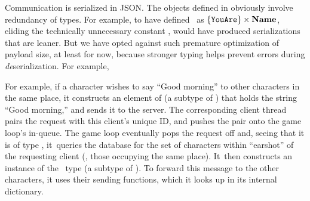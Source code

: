 
Communication is serialized in JSON\@. The objects defined
in  obviously involve redundancy of types. For
example, to have defined \youarevalset\ as
$\{ \texttt{YouAre} \} \times \textbf{Name} $, eliding the technically
unnecessary constant \charnametg, would have produced serializations
that are leaner. But we have opted against such premature optimization
of payload size, at least for now, because stronger typing helps
prevent errors during {\em de}serialization. For example,

For example, if a character wishes to say ``Good morning'' to other
characters in the same place, it constructs an element of
\sayreqset (a subtype of \reqset) that
holds the string ``Good morning,'' and sends it to the server.  The
corresponding client thread pairs the request with this client's
unique ID, and pushes the pair onto the game loop's in-queue.  The
game loop eventually pops the request off and, seeing that it is of
type \sayreqset, it~queries the database for the set of characters
within ``earshot'' of the requesting client (\ie, those occupying the
same place).  It~then constructs an instance of the
\saidevtset\ type (a subtype of \evtset).
To forward this message to the other characters, it uses their sending
functions, which it looks up in its internal dictionary.

